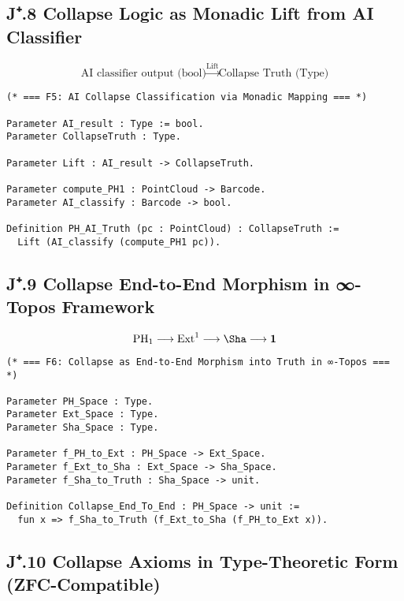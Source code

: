 \documentclass[11pt]{article}
\theoremstyle{definition}
\begin{document}
\subsection*{J⁺.8 Collapse Logic as Monadic Lift from AI Classifier}

\[
\text{AI classifier output (bool)} \xrightarrow{\text{Lift}} \text{Collapse Truth (Type)}
\]

\begin{lstlisting}[language=Coq, caption=Monadic Mapping from AI Classifier to Collapse Truth]
(* === F5: AI Collapse Classification via Monadic Mapping === *)

Parameter AI_result : Type := bool.
Parameter CollapseTruth : Type.

Parameter Lift : AI_result -> CollapseTruth.

Parameter compute_PH1 : PointCloud -> Barcode.
Parameter AI_classify : Barcode -> bool.

Definition PH_AI_Truth (pc : PointCloud) : CollapseTruth :=
  Lift (AI_classify (compute_PH1 pc)).
\end{lstlisting}

\subsection*{J⁺.9 Collapse End-to-End Morphism in ∞-Topos Framework}

\[
\mathrm{PH}_1 \longrightarrow \mathrm{Ext}^1 \longrightarrow \Sha \longrightarrow \mathbf{1}
\]

\begin{lstlisting}[language=Coq, caption=Collapse Structure as End-to-End Morphism into Truth]
(* === F6: Collapse as End-to-End Morphism into Truth in ∞-Topos === *)

Parameter PH_Space : Type.
Parameter Ext_Space : Type.
Parameter Sha_Space : Type.

Parameter f_PH_to_Ext : PH_Space -> Ext_Space.
Parameter f_Ext_to_Sha : Ext_Space -> Sha_Space.
Parameter f_Sha_to_Truth : Sha_Space -> unit.

Definition Collapse_End_To_End : PH_Space -> unit :=
  fun x => f_Sha_to_Truth (f_Ext_to_Sha (f_PH_to_Ext x)).
\end{lstlisting}

\subsection*{J⁺.10 Collapse Axioms in Type-Theoretic Form (ZFC-Compatible)}
\end{document}
